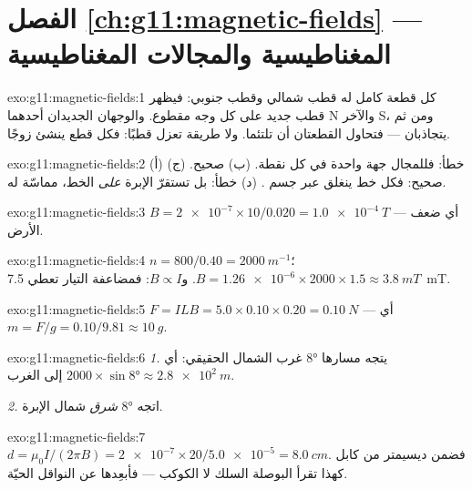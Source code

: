 \section*{الفصل \ref{ch:g11:magnetic-fields} --- المغناطيسية والمجالات المغناطيسية}

\begin{solution}{exo:g11:magnetic-fields:1}
كل قطعة  كامل له قطب شمالي وقطب جنوبي: فيظهر قطب
جديد على كل وجه مقطوع. والوجهان الجديدان أحدهما N والآخر S، ومن ثم
يتجاذبان --- فتحاول القطعتان أن تلتئما. ولا طريقة تعزل
قطبًا: فكل قطع ينشئ زوجًا.
\end{solution}

\begin{solution}{exo:g11:magnetic-fields:2}
(أ) خطأ: فللمجال جهة واحدة في كل نقطة. (ب) صحيح.
(ج) صحيح: فكل خط ينغلق عبر جسم . (د) خطأ: بل تستقرّ
الإبرة \emph{على} الخط، مماسّة له.
\end{solution}

\begin{solution}{exo:g11:magnetic-fields:3}
$B = \num{2e-7} \times 10 / 0.020 = \qty{1.0e-4}{T}$ --- أي ضعف 
الأرض.
\end{solution}

\begin{solution}{exo:g11:magnetic-fields:4}
$n = 800/0.40 = \qty{2000}{m^{-1}}$؛
$B = \num{1.26e-6} \times 2000 \times 1.5 \approx \qty{3.8}{mT}$.
و$B \propto I$: فمضاعفة التيار تعطي \qty{7.5}{mT}.
\end{solution}

\begin{solution}{exo:g11:magnetic-fields:5}
$F = ILB = 5.0 \times 0.10 \times 0.20 = \qty{0.10}{N}$ --- أي 
$m = F/g = 0.10/9.81 \approx \qty{10}{g}$.
\end{solution}

\begin{solution}{exo:g11:magnetic-fields:6}
\emph{1.} يتجه مسارها $\ang{8}$ غرب الشمال الحقيقي:
أي $2000 \times \sin\ang{8} \approx \qty{2.8e2}{m}$ إلى الغرب.

\emph{2.} اتجه $\ang{8}$ \emph{شرق} شمال الإبرة.
\end{solution}

\begin{solution}{exo:g11:magnetic-fields:7}
$d = \mu_0 I / (2\pi B) = \num{2e-7} \times 20 / \num{5.0e-5}
= \qty{8.0}{cm}$. فضمن ديسيمتر من كابل كهذا تقرأ البوصلة
السلك لا الكوكب --- فأبعِدها عن النواقل الحيّة.
\end{solution}


